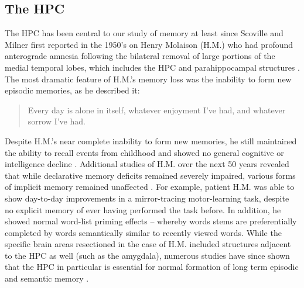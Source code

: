 \subsection{The \acl{HPC}}
\label{sec:intro:memory:hpc}
The \ac{HPC} has been central to our study of memory at least since Scoville and Milner first reported in the 1950's on Henry Molaison (H.M.) who had profound anterograde amnesia following the bilateral removal of large portions of the medial temporal lobes, which includes the \ac{HPC} and parahippocampal structures \citep{Scoville1957}.
The most dramatic feature of H.M.'s memory loss was the inability to form new episodic memories, as he described it:
\begin{quote}
Every day is alone in itself, whatever enjoyment I've had, and whatever sorrow I've had.
\end{quote}
Despite H.M.'s near complete inability to form new memories, he still maintained the ability to recall events from childhood and showed no general cognitive or intelligence decline \citep{Squire2009}.
Additional studies of H.M. over the next 50 years revealed that while declarative memory deficits remained severely impaired, various forms of implicit memory remained unaffected \citep{Corkin2002}.
For example, patient H.M. was able to show day-to-day improvements in a mirror-tracing motor-learning task, despite no explicit memory of ever having performed the task before.
In addition, he showed normal word-list priming effects -- whereby words stems are preferentially completed by words semantically similar to recently viewed words. 
While the specific brain areas resectioned in the case of H.M. included structures adjacent to the \ac{HPC} as well (such as the amygdala), numerous studies have since shown that the \ac{HPC} in particular is essential for normal formation of long term episodic and semantic memory \citep[reviewed in][]{Eichenbaum2000, Burgess2002}.

